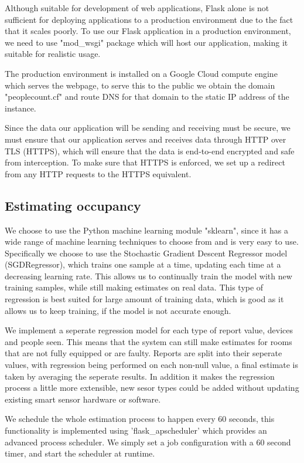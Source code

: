 \documentclass{l4proj}
\begin{document}
Although suitable for development of web applications, Flask alone is not sufficient for deploying applications to a production environment due to the fact that it scales poorly. To use our Flask application in a production environment, we need to use "mod\_wsgi" package which will host our application, making it suitable for realistic usage.

The production environment is installed on a Google Cloud compute engine which serves the webpage, to serve this to the public we obtain the domain "peoplecount.cf" and route DNS for that domain to the static IP address of the instance.

Since the data our application will be sending and receiving must be secure, we must ensure that our application serves and receives data through HTTP over TLS (HTTPS), which will ensure that the data is end-to-end encrypted and safe from interception.
To make sure that HTTPS is enforced, we set up a redirect from any HTTP requests to the HTTPS equivalent.

\subsection{Estimating occupancy}

We choose to use the Python machine learning module "sklearn", since it has a wide range of machine learning techniques to choose from and is very easy to use. Specifically we choose to use the Stochastic Gradient Descent Regressor model (SGDRegressor), which trains one sample at a time, updating each time at a decreasing learning rate. This allows us to continually train the model with new training samples, while still making estimates on real data. This type of regression is best suited for large amount of training data, which is good as it allows us to keep training, if the model is not accurate enough.

We implement a seperate regression model for each type of report value, devices and people seen. This means that the system can still make estimates for rooms that are not fully equipped or are faulty. Reports are split into their seperate values, with regression being performed on each non-null value, a final estimate is taken by averaging the seperate results. In addition it makes the regression process a little more extensible, new sesor types could be added without updating existing smart sensor hardware or software.

We schedule the whole estimation process to happen every 60 seconds, this functionality is implemented using 'flask\_apscheduler' which provides an advanced process scheduler. We simply set a job configuration with a 60 second timer, and start the scheduler at runtime.
\end{document}

